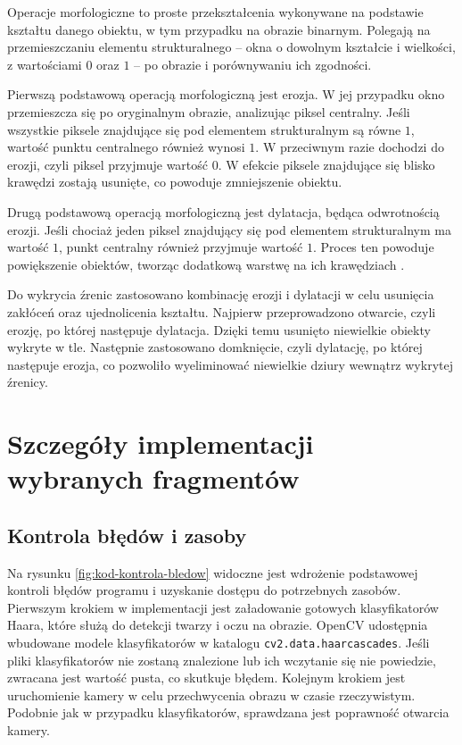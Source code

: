 \documentclass[a4paper,twoside,12pt]{book}
\begin{document}
Operacje morfologiczne to proste przekształcenia wykonywane na podstawie kształtu danego obiektu, w tym przypadku na obrazie binarnym. Polegają na przemieszczaniu elementu strukturalnego -- okna o dowolnym kształcie i wielkości, z wartościami $0$ oraz $1$ -- po obrazie i porównywaniu ich zgodności.

Pierwszą podstawową operacją morfologiczną jest erozja. W jej przypadku okno przemieszcza się po oryginalnym obrazie, analizując piksel centralny. Jeśli wszystkie piksele znajdujące się pod elementem strukturalnym są równe $1$, wartość punktu centralnego również wynosi $1$. W przeciwnym razie dochodzi do erozji, czyli piksel przyjmuje wartość $0$. W efekcie piksele znajdujące się blisko krawędzi zostają usunięte, co powoduje zmniejszenie obiektu.

Drugą podstawową operacją morfologiczną jest dylatacja, będąca odwrotnością erozji. Jeśli chociaż jeden piksel znajdujący się pod elementem strukturalnym ma wartość $1$, punkt centralny również przyjmuje wartość $1$. Proces ten powoduje powiększenie obiektów, tworząc dodatkową warstwę na ich krawędziach \cite{bib:Morfologia-OpenCV}.

Do wykrycia źrenic zastosowano kombinację erozji i dylatacji w celu usunięcia zakłóceń oraz ujednolicenia kształtu. Najpierw przeprowadzono otwarcie, czyli erozję, po której następuje dylatacja. Dzięki temu usunięto niewielkie obiekty wykryte w tle. Następnie zastosowano domknięcie, czyli dylatację, po której następuje erozja, co pozwoliło wyeliminować niewielkie dziury wewnątrz wykrytej źrenicy.


\FloatBarrier

\section{Szczegóły implementacji wybranych fragmentów}
\label{sec:szczegoly-implementacji-wybranych-fragmentow}

\subsection{Kontrola błędów i zasoby}
\label{subsec:Kontrola-bledow}

Na rysunku \ref{fig:kod-kontrola-bledow} widoczne jest wdrożenie podstawowej kontroli błędów programu i uzyskanie dostępu do potrzebnych zasobów. Pierwszym krokiem w implementacji jest załadowanie gotowych klasyfikatorów Haara, które służą do detekcji twarzy i oczu na obrazie. OpenCV udostępnia wbudowane modele klasyfikatorów w katalogu \texttt{cv2\-.data\-.haarcascades}. Jeśli pliki klasyfikatorów nie zostaną znalezione lub ich wczytanie się nie powiedzie, zwracana jest wartość pusta, co skutkuje błędem. Kolejnym krokiem jest uruchomienie kamery w celu przechwycenia obrazu w czasie rzeczywistym. Podobnie jak w przypadku klasyfikatorów, sprawdzana jest poprawność otwarcia kamery.
\end{document}
